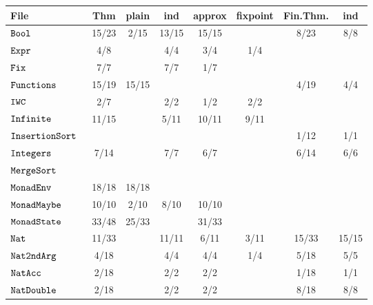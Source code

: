 %
%
%
%
\begin{tabular}{>{\footnotesize}l || >{\footnotesize}c | >{\footnotesize}c | >{\footnotesize}c | >{\footnotesize}c | >{\footnotesize}c || >{\footnotesize}c | >{\footnotesize}c}
File                       & Thm & plain & ind & approx & fixpoint & Fin.Thm. & ind \\
\hline
$\ts{Bool                    }$   & 15/23 & 2/15 & 13/15 & 15/15 &  & 8/23 & 8/8\\
$\ts{Expr                    }$   & 4/8 &  & 4/4 & 3/4 & 1/4 &  & \\
$\ts{Fix                     }$   & 7/7 &  & 7/7 & 1/7 &  &  & \\
$\ts{Functions               }$   & 15/19 & 15/15 &  &  &  & 4/19 & 4/4\\
$\ts{IWC                     }$   & 2/7 &  & 2/2 & 1/2 & 2/2 &  & \\
$\ts{Infinite                }$   & 11/15 &  & 5/11 & 10/11 & 9/11 &  & \\
$\ts{InsertionSort           }$   &  &  &  &  &  & 1/12 & 1/1\\
$\ts{Integers                }$   & 7/14 &  & 7/7 & 6/7 &  & 6/14 & 6/6\\
$\ts{MergeSort               }$   &  &  &  &  &  &  & \\
$\ts{MonadEnv                }$   & 18/18 & 18/18 &  &  &  &  & \\
$\ts{MonadMaybe              }$   & 10/10 & 2/10 & 8/10 & 10/10 &  &  & \\
$\ts{MonadState              }$   & 33/48 & 25/33 &  & 31/33 &  &  & \\
$\ts{Nat                     }$   & 11/33 &  & 11/11 & 6/11 & 3/11 & 15/33 & 15/15\\
$\ts{Nat2ndArg               }$   & 4/18 &  & 4/4 & 4/4 & 1/4 & 5/18 & 5/5\\
$\ts{NatAcc                  }$   & 2/18 &  & 2/2 & 2/2 &  & 1/18 & 1/1\\
$\ts{NatDouble               }$   & 2/18 &  & 2/2 & 2/2 &  & 8/18 & 8/8\\

\end{tabular}
